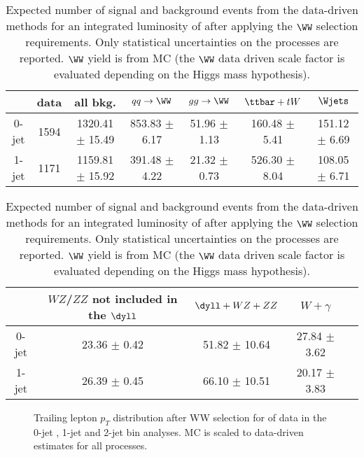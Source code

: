 \begin{table}[ht!]
  \begin{center}
 {\small
  \begin{tabular} {|c|c|c|c|c|c|c|}
\hline
          &   data & all bkg. & $qq \to \WW$ & $gg \to \WW$ &  $\ttbar+tW$   & $\Wjets$    \\
  \hline
  \hline
	0-jet	&   1594 & 1320.41 $\pm$ 15.49 &   853.83  $\pm$  6.17 & 51.96 $\pm$  1.13 &  160.48 $\pm$  5.41  & 151.12 $\pm$  6.69  \\	   
	1-jet	&   1171 & 1159.81 $\pm$ 15.92 &   391.48  $\pm$  4.22 & 21.32 $\pm$  0.73 &  526.30 $\pm$  8.04  & 108.05 $\pm$  6.71  \\   
 \hline
 \hline
  \end{tabular}
  \begin{tabular} {|c|c|c|c|c|}
\hline
       & $WZ$/$ZZ$ not included in the $\dyll$ & $\dyll+WZ+ZZ$ & $W+\gamma$ \\
  \hline
  \hline
	0-jet 	&  23.36 $\pm$  0.42 & 51.82 $\pm$ 10.64 & 27.84 $\pm$  3.62 \\ 
	1-jet 	&  26.39 $\pm$  0.45 & 66.10 $\pm$ 10.51 & 20.17 $\pm$  3.83 \\
 \hline
 \hline
  \end{tabular}
  }
  \caption{\fixme Expected number of signal and background events from the data-driven methods for 
  an integrated luminosity of \intlumiEightTeV after applying the $\WW$ selection requirements. 
  Only statistical uncertainties on the processes are reported.
  $\WW$ yield is from MC (the $\WW$ data driven scale factor is evaluated depending on the Higgs mass hypothesis).}
   \label{tab:wwselection_all_dymva}
  \end{center}
\end{table}

\begin{figure}[!hbtp]
\centering
\subfigure[]{
\centering
\label{subfig:ww_ptmin_0j}
}
\subfigure[]{
\centering
\label{subfig:ww_ptmin_1j}
}
\subfigure[]{
\centering
\label{subfig:ww_ptmin_2j}
}
\caption{\fixme Trailing lepton $p_T$ distribution after WW selection for \intlumiEightTeV of data in the 0-jet , 
1-jet  and 2-jet  bin analyses. 
MC is scaled to data-driven estimates for all processes.}
\label{fig:ww_ptmin}
\end{figure}

